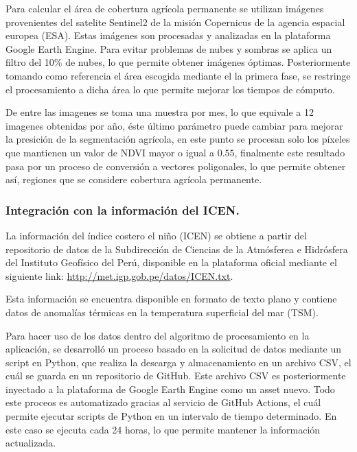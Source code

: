      Para calcular el área de cobertura agrícola permanente se utilizan imágenes provenientes del satelite Sentinel2 de la misión Copernicus de la agencia espacial europea (ESA). Estas imágenes son procesadas y analizadas en la plataforma Google Earth Engine. Para evitar problemas de nubes y sombras se aplica un filtro del 10\% de nubes, lo que permite obtener imágenes óptimas. Posteriormente tomando como referencia el área escogida mediante el la primera fase, se restringe el procesamiento a dicha área lo que permite mejorar los tiempos de cómputo.

      De entre las imagenes se toma una muestra por mes, lo que equivale a 12 imagenes obtenidas por año, éste último parámetro puede cambiar para mejorar la presición de la segmentación agrícola, en este punto se procesan solo los píxeles que mantienen un valor de NDVI mayor o igual a $0.55$, finalmente este resultado pasa por un proceso de conversión a vectores poligonales, lo que permite obtener así, regiones que se considere cobertura agrícola permanente.

      \subsubsection{\textbf{Integración con la información del ICEN.}}
      
      La información del índice costero el niño (ICEN) se obtiene a partir del repositorio de datos de la Subdirección de Ciencias de la Atmósferea e Hidrósfera del Instituto Geofísico del Perú, disponible en la plataforma oficial mediante el siguiente link: \href{http://met.igp.gob.pe/datos/ICEN.txt}{http://met.igp.gob.pe/datos/ICEN.txt}.
      
      Esta información se encuentra disponible en formato de texto plano y contiene datos de anomalías térmicas en la temperatura superficial del mar (TSM).

      Para hacer uso de los datos dentro del algoritmo de procesamiento en la aplicación, se desarrolló un proceso basado en la solicitud de datos mediante un script en Python, que realiza la descarga y almacenamiento en un archivo CSV, el cuál se guarda en un repositorio de GitHub. Este archivo CSV es posteriormente inyectado a la plataforma de Google Earth Engine como un asset nuevo. Todo este proceos es automatizado gracias al servicio de GitHub Actions, el cuál permite ejecutar scripts de Python en un intervalo de tiempo determinado. En este caso se ejecuta cada 24 horas, lo que permite mantener la información actualizada.

